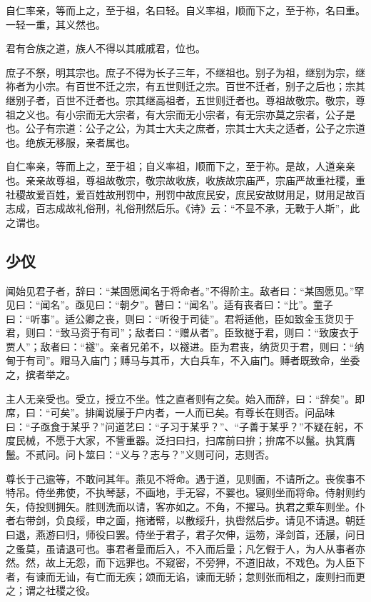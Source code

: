 \documentclass[]{article}
\begin{document}
自仁率亲，等而上之，至于祖，名曰轻。自义率祖，顺而下之，至于祢，名曰重。一轻一重，其义然也。

君有合族之道，族人不得以其戚戚君，位也。

庶子不祭，明其宗也。庶子不得为长子三年，不继祖也。别子为祖，继别为宗，继祢者为小宗。有百世不迁之宗，有五世则迁之宗。百世不迁者，别子之后也；宗其继别子者，百世不迁者也。宗其继高祖者，五世则迁者也。尊祖故敬宗。敬宗，尊祖之义也。有小宗而无大宗者，有大宗而无小宗者，有无宗亦莫之宗者，公子是也。公子有宗道：公子之公，为其士大夫之庶者，宗其士大夫之适者，公子之宗道也。绝族无移服，亲者属也。

自仁率亲，等而上之，至于祖；自义率祖，顺而下之，至于祢。是故，人道亲亲也。亲亲故尊祖，尊祖故敬宗，敬宗故收族，收族故宗庙严，宗庙严故重社稷，重社稷故爱百姓，爱百姓故刑罚中，刑罚中故庶民安，庶民安故财用足，财用足故百志成，百志成故礼俗刑，礼俗刑然后乐。《诗》云：``不显不承，无斁于人斯''，此之谓也。

\hypertarget{header-n511}{%
\subsection{少仪}\label{header-n511}}

闻始见君子者，辞曰：``某固愿闻名于将命者。''不得阶主。敌者曰：``某固愿见。''罕见曰：``闻名''。亟见曰：``朝夕''。瞽曰：``闻名''。适有丧者曰：``比''。童子曰：``听事''。适公卿之丧，则曰：``听役于司徒''。君将适他，臣如致金玉货贝于君，则曰：``致马资于有司''；敌者曰：``赠从者''。臣致禭于君，则曰：``致废衣于贾人''；敌者曰：``襚''。亲者兄弟不，以襚进。臣为君丧，纳货贝于君，则曰：``纳甸于有司''。赗马入庙门；赙马与其币，大白兵车，不入庙门。赙者既致命，坐委之，摈者举之。

主人无亲受也。受立，授立不坐。性之直者则有之矣。始入而辞，曰：``辞矣''。即席，曰：``可矣''。排阖说屦于户内者，一人而已矣。有尊长在则否。问品味曰：``子亟食于某乎？''问道艺曰：``子习于某乎？''、``子善于某乎？''不疑在躬，不度民械，不愿于大家，不訾重器。泛扫曰扫，扫席前曰拚；拚席不以鬣。执箕膺鬛。不贰问。问卜筮曰：``义与？志与？''义则可问，志则否。

尊长于己逾等，不敢问其年。燕见不将命。遇于道，见则面，不请所之。丧俟事不特吊。侍坐弗使，不执琴瑟，不画地，手无容，不翣也。寝则坐而将命。侍射则约矢，侍投则拥矢。胜则洗而以请，客亦如之。不角，不擢马。执君之乘车则坐。仆者右带剑，负良绥，申之面，拖诸幦，以散绥升，执辔然后步。请见不请退。朝廷曰退，燕游曰归，师役曰罢。侍坐于君子，君子欠伸，运笏，泽剑首，还屦，问日之蚤莫，虽请退可也。事君者量而后入，不入而后量；凡乞假于人，为人从事者亦然。然，故上无怨，而下远罪也。不窥密，不旁狎，不道旧故，不戏色。为人臣下者，有谏而无讪，有亡而无疾；颂而无谄，谏而无骄；怠则张而相之，废则扫而更之；谓之社稷之役。
\end{document}
